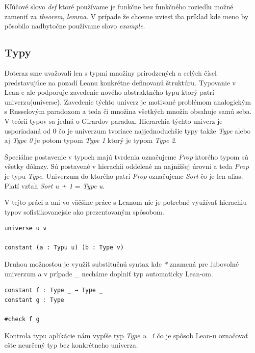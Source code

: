 \documentclass[a4paper,10pt,oneside]{report}%
\begin{document}
    Kľúčové slovo \emph{def} ktoré používame je funkčne bez funkčného roziedlu možné
zameniť za \emph{theorem}, \emph{lemma}. V prípade že chceme uviesť iba príklad
kde meno by pôsobilo nadbytočne používame slovo \emph{example}.

\subsection{Typy}
    Doteraz sme uvažovali len s typmi množiny prirodzených a celých čísel
predstavujúce na pozadí Leanu konkrétne definovanú štruktúru.
    Typovanie v Lean-e ale podporuje zavedenie nového abstraktného typu ktorý patrí univerzu(universe).
    Zavedenie týchto univerz je motivané problémom analogickým s Russelovým paradoxom 
a teda či množina všetkých množín obsahuje samú seba.
    V teórii typov sa jedná o Girardov paradox.
    Hierarchia týchto univerz je usporiadaná od 0 čo je univerzum tvoriace najjednoduchšie
typy takže \emph{Type} alebo aj \emph{Type 0} je potom typom \emph{Type 1} ktorý
je typom \emph{Type 2}.

    Špeciálne postavenie v typoch majú tvrdenia označujeme \emph{Prop} ktorého
typom sú všetky dôkazy.
    Sú postavené v hierachii oddelené na najnižšej úrovni a teda \emph{Prop} je 
typu \emph{Type}.
    Univerzum do ktorého patrí \emph{Prop} označujeme \emph{Sort} čo je len 
alias.
Platí vzťah \emph{Sort u + 1} = \emph{Type u}.

V tejto práci a ani vo väčšine práce s Leanom nie je potrebné využívať hierachiu
    typov sofistikovanejsie ako prezentovaným spôsobom.
\begin{lstlisting}
universe u v

constant (a : Typu u) (b : Type v)
\end{lstlisting}
Druhou možnosťou je využiť substitučnú syntax kde \emph{*} znamená pre ľubovoľné univerzum
a v prípade \emph{\_} necháme doplniť typ automaticky Lean-om.
\begin{lstlisting}
constant f : Type _ → Type _
constant g : Type

#check f g
\end{lstlisting}
    Kontrola typu aplikácie nám vypíše typ \emph{Type u\_1} čo je spôsob Lean-u označovať
ešte neurčený typ bez konkrétneho univerza.
\end{document}
